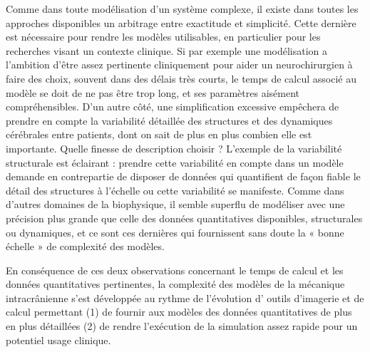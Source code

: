 Comme dans toute modélisation d'un système complexe, il existe dans toutes les approches
disponibles un arbitrage entre exactitude et simplicité. Cette dernière est nécessaire pour rendre les
modèles utilisables, en particulier pour les recherches visant un contexte clinique. Si par exemple une
modélisation a l'ambition d'être assez pertinente cliniquement pour aider un neurochirurgien à faire
des choix, souvent dans des délais très courts, le temps de calcul associé au modèle se doit de ne pas
être trop long, et ses paramètres aisément compréhensibles. D'un autre côté, une simplification
excessive empêchera de prendre en compte la variabilité détaillée des structures et des dynamiques
cérébrales entre patients, dont on sait de plus en plus combien elle est importante. Quelle finesse de
description choisir ? L'exemple de la variabilité structurale est éclairant : prendre cette variabilité en
compte dans un modèle demande en contrepartie de disposer de données qui quantifient de façon
fiable le détail des structures à l'échelle ou cette variabilité se manifeste. Comme dans d'autres
domaines de la biophysique, il semble superflu de modéliser avec une précision plus grande que celle des données quantitatives disponibles, structurales ou dynamiques, et ce sont ces dernières qui
fournissent sans doute la « bonne échelle » de complexité des modèles.

En conséquence de ces deux observations concernant le temps de calcul et les données
quantitatives pertinentes, la complexité des modèles de la mécanique intracrânienne s'est développée
au rythme de l'évolution d' outils d'imagerie et de calcul permettant (1) de fournir aux modèles des
données quantitatives de plus en plus détaillées (2) de rendre l'exécution de la simulation assez rapide
pour un potentiel usage clinique.

